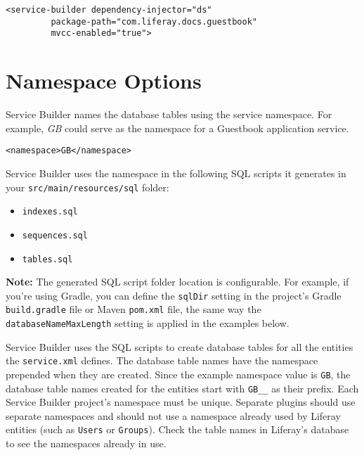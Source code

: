 \begin{verbatim}
<service-builder dependency-injector="ds"
         package-path="com.liferay.docs.guestbook"
         mvcc-enabled="true">
\end{verbatim}

\section{Namespace Options}\label{namespace-options}

Service Builder names the database tables using the service namespace.
For example, \emph{GB} could serve as the namespace for a Guestbook
application service.

\begin{verbatim}
<namespace>GB</namespace>
\end{verbatim}

Service Builder uses the namespace in the following SQL scripts it
generates in your \texttt{src/main/resources/sql} folder:

\begin{itemize}
\tightlist
\item
  \texttt{indexes.sql}
\item
  \texttt{sequences.sql}
\item
  \texttt{tables.sql}
\end{itemize}

\noindent\hrulefill

\textbf{Note:} The generated SQL script folder location is configurable.
For example, if you're using Gradle, you can define the \texttt{sqlDir}
setting in the project's Gradle \texttt{build.gradle} file or Maven
\texttt{pom.xml} file, the same way the \texttt{databaseNameMaxLength}
setting is applied in the examples below.

\noindent\hrulefill

Service Builder uses the SQL scripts to create database tables for all
the entities the \texttt{service.xml} defines. The database table names
have the namespace prepended when they are created. Since the example
namespace value is \texttt{GB}, the database table names created for the
entities start with \texttt{GB\_\_} as their prefix. Each Service
Builder project's namespace must be unique. Separate plugins should use
separate namespaces and should not use a namespace already used by
Liferay entities (such as \texttt{Users} or \texttt{Groups}). Check the
table names in Liferay's database to see the namespaces already in use.

